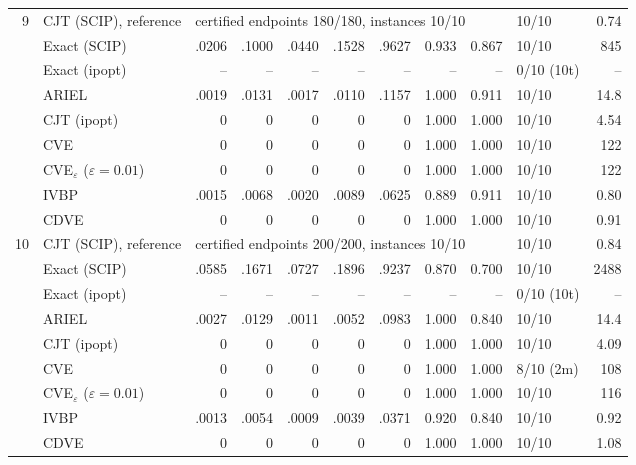 \begin{table}[htbp]
\begin{tabular}{rlrrrrrrrlr}
\midrule
9 & CJT (SCIP), reference & \multicolumn{7}{l}{certified endpoints 180/180, instances 10/10} & 10/10 & 0.74 \\
 & Exact (SCIP) & .0206 & .1000 & .0440 & .1528 & .9627 & 0.933 & 0.867 & 10/10 & 845 \\
 & Exact (ipopt) & -- & -- & -- & -- & -- & -- & -- & 0/10 (10t) & -- \\
 & ARIEL & .0019 & .0131 & .0017 & .0110 & .1157 & 1.000 & 0.911 & 10/10 & 14.8 \\
 & CJT (ipopt) & 0 & 0 & 0 & 0 & 0 & 1.000 & 1.000 & 10/10 & 4.54 \\
 & CVE & 0 & 0 & 0 & 0 & 0 & 1.000 & 1.000 & 10/10 & 122 \\
 & CVE$_\varepsilon$ ($\varepsilon{=}0.01$) & 0 & 0 & 0 & 0 & 0 & 1.000 & 1.000 & 10/10 & 122 \\
 & IVBP & .0015 & .0068 & .0020 & .0089 & .0625 & 0.889 & 0.911 & 10/10 & 0.80 \\
 & CDVE & 0 & 0 & 0 & 0 & 0 & 1.000 & 1.000 & 10/10 & 0.91 \\
\midrule
10 & CJT (SCIP), reference & \multicolumn{7}{l}{certified endpoints 200/200, instances 10/10} & 10/10 & 0.84 \\
 & Exact (SCIP) & .0585 & .1671 & .0727 & .1896 & .9237 & 0.870 & 0.700 & 10/10 & 2488 \\
 & Exact (ipopt) & -- & -- & -- & -- & -- & -- & -- & 0/10 (10t) & -- \\
 & ARIEL & .0027 & .0129 & .0011 & .0052 & .0983 & 1.000 & 0.840 & 10/10 & 14.4 \\
 & CJT (ipopt) & 0 & 0 & 0 & 0 & 0 & 1.000 & 1.000 & 10/10 & 4.09 \\
 & CVE & 0 & 0 & 0 & 0 & 0 & 1.000 & 1.000 & 8/10 (2m) & 108 \\
 & CVE$_\varepsilon$ ($\varepsilon{=}0.01$) & 0 & 0 & 0 & 0 & 0 & 1.000 & 1.000 & 10/10 & 116 \\
 & IVBP & .0013 & .0054 & .0009 & .0039 & .0371 & 0.920 & 0.840 & 10/10 & 0.92 \\
 & CDVE & 0 & 0 & 0 & 0 & 0 & 1.000 & 1.000 & 10/10 & 1.08 \\
\bottomrule
\end{tabular}
\end{table}
